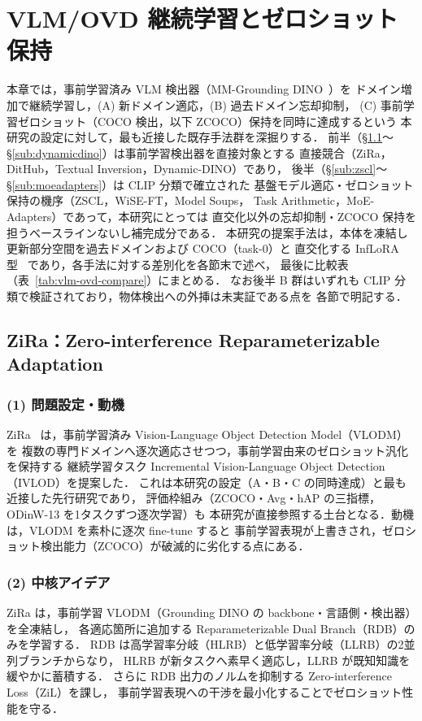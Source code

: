 \section{VLM/OVD 継続学習とゼロショット保持}
\label{sec:vlm-ovd-adaptation}
本章では，事前学習済み VLM 検出器（MM-Grounding DINO~\cite{mmgdino}）を
ドメイン増加で継続学習し，(A) 新ドメイン適応，(B) 過去ドメイン忘却抑制，
(C) 事前学習ゼロショット（COCO 検出，以下 ZCOCO）保持を同時に達成するという
本研究の設定に対して，最も近接した既存手法群を深掘りする．
前半（\S\ref{sub:zira}〜\S\ref{sub:dynamicdino}）は事前学習検出器を直接対象とする
直接競合（ZiRa，DitHub，Textual Inversion，Dynamic-DINO）であり，
後半（\S\ref{sub:zscl}〜\S\ref{sub:moeadapters}）は CLIP 分類で確立された
基盤モデル適応・ゼロショット保持の機序（ZSCL，WiSE-FT，Model Soups，
Task Arithmetic，MoE-Adapters）であって，本研究にとっては
直交化以外の忘却抑制・ZCOCO 保持を担うベースラインないし補完成分である．
本研究の提案手法は，本体を凍結し更新部分空間を過去ドメインおよび COCO（task-0）と
直交化する InfLoRA 型~\cite{inflora} であり，各手法に対する差別化を各節末で述べ，
最後に比較表（表~\ref{tab:vlm-ovd-compare}）にまとめる．
なお後半 B 群はいずれも CLIP 分類で検証されており，物体検出への外挿は未実証である点を
各節で明記する．

\subsection{ZiRa：Zero-interference Reparameterizable Adaptation}
\label{sub:zira}

\subsubsection*{(1) 問題設定・動機}
ZiRa~\cite{zira} は，事前学習済み Vision-Language Object Detection Model（VLODM）を
複数の専門ドメインへ逐次適応させつつ，事前学習由来のゼロショット汎化を保持する
継続学習タスク Incremental Vision-Language Object Detection（IVLOD）を提案した．
これは本研究の設定（A・B・C の同時達成）と最も近接した先行研究であり，
評価枠組み（ZCOCO・Avg・hAP の三指標，ODinW-13 を1タスクずつ逐次学習）も
本研究が直接参照する土台となる．動機は，VLODM を素朴に逐次 fine-tune すると
事前学習表現が上書きされ，ゼロショット検出能力（ZCOCO）が破滅的に劣化する点にある．

\subsubsection*{(2) 中核アイデア}
ZiRa は，事前学習 VLODM（Grounding DINO の backbone・言語側・検出器）を全凍結し，
各適応箇所に追加する Reparameterizable Dual Branch（RDB）のみを学習する．
RDB は高学習率分岐（HLRB）と低学習率分岐（LLRB）の2並列ブランチからなり，
HLRB が新タスクへ素早く適応し，LLRB が既知知識を緩やかに蓄積する．
さらに RDB 出力のノルムを抑制する Zero-interference Loss（ZiL）を課し，
事前学習表現への干渉を最小化することでゼロショット性能を守る．

